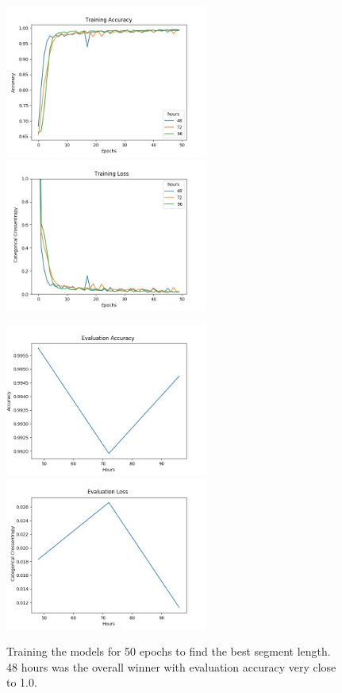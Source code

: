 \begin{figure}
      \begin{multicols}{2}
            \includegraphics[height=5cm]{img/control_condition/plot_acc_train_50e.png}
            \includegraphics[height=5cm]{img/control_condition/plot_loss_train_50e.png}

            \includegraphics[height=5cm]{img/control_condition/plot_acc_eval_50e.png}
            \includegraphics[height=5cm]{img/control_condition/plot_loss_eval_50e.png}
      \end{multicols}
      \caption{Training the models for 50 epochs to find the best segment length. 48 hours was the overall winner with evaluation accuracy very close to 1.0.}
      \label{figure:control_condition_50e}
\end{figure}

